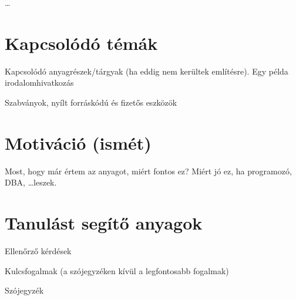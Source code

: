 \ldots

\section{Kapcsolódó témák}

Kapcsolódó anyagrészek/tárgyak (ha eddig nem kerültek említésre). Egy példa irodalomhivatkozás~\cite{DBLP:books/cs/Ullman88}

Szabványok, nyílt forráskódú és fizetős eszközök

\section{Motiváció (ismét)}

Most, hogy már értem az anyagot, miért fontos ez? Miért jó ez, ha programozó, DBA, \ldots leszek.

\section{Tanulást segítő anyagok}

Ellenőrző kérdések

Kulcsfogalmak (a szójegyzéken kívül a legfontosabb fogalmak)

Szójegyzék